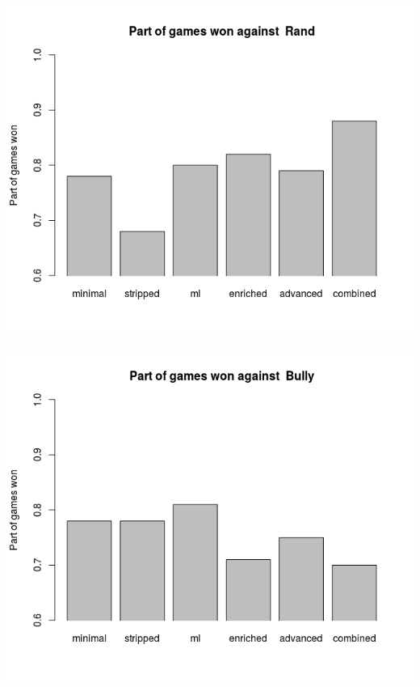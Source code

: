 \documentclass[a4paper,11pt]{article}
\begin{document}
\begin{center}
\begin{minipage}{0.49\linewidth}
\includegraphics[width=\linewidth]{images/barplotRand.png}
\end{minipage}
\hfill
\begin{minipage}{0.49\linewidth}
\includegraphics[width=\linewidth]{images/barplotBully.png}
\end{minipage}
      \\ %

\end{center}
\end{document}

